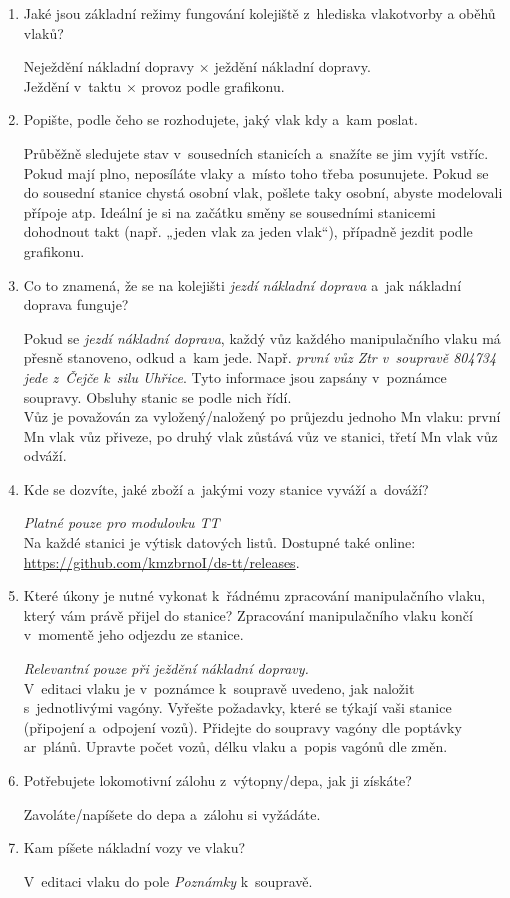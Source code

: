 \documentclass[12pt,a4paper]{article}
\def\uv#1{„#1“}
\def\solution#1{\ifsolution \par{\color{gray}#1}\fi}
\begin{document}
\begin{enumerate}[leftmargin=*]
\item Jaké jsou základní režimy fungování kolejiště z~hlediska vlakotvorby
a oběhů vlaků?
\solution{Neježdění nákladní dopravy × ježdění nákladní dopravy. \\
Ježdění v~taktu × provoz podle grafikonu.}

\item Popište, podle čeho se rozhodujete, jaký vlak kdy a~kam poslat.
\solution{Průběžně sledujete stav v~sousedních stanicích a~snažíte se jim vyjít
vstříc. Pokud mají plno, neposíláte vlaky a~místo toho třeba posunujete. Pokud
se do sousední stanice chystá osobní vlak, pošlete taky osobní, abyste
modelovali přípoje atp. Ideální je si na začátku směny se sousedními stanicemi
dohodnout takt (např. \uv{jeden vlak za jeden vlak}), případně jezdit podle
grafikonu.}

\item Co to znamená, že se na kolejišti \textit{jezdí nákladní doprava} a~jak
nákladní doprava funguje?
\solution{Pokud se \textit{jezdí nákladní doprava}, každý vůz každého
manipulačního vlaku má přesně stanoveno, odkud a~kam jede. Např. \textit{první
vůz Ztr v~soupravě 804734 jede z~Čejče k~silu Uhřice}. Tyto informace jsou
zapsány v~poznámce soupravy. Obsluhy stanic se podle nich řídí. \\ Vůz je
považován za vyložený/naložený po průjezdu jednoho Mn vlaku: první Mn vlak vůz
přiveze, po druhý vlak zůstává vůz ve stanici, třetí Mn vlak vůz odváží.}

\item Kde se dozvíte, jaké zboží a~jakými vozy stanice vyváží a~dováží?
\solution{\textit{Platné pouze pro modulovku TT} \\ Na každé stanici je výtisk
datových listů. Dostupné také online:\\
\url{https://github.com/kmzbrnoI/ds-tt/releases}}.

\item Které úkony je nutné vykonat k~řádnému zpracování manipulačního vlaku,
který vám právě přijel do stanice? Zpracování manipulačního vlaku končí
v~momentě jeho odjezdu ze stanice.
\solution{\textit{Relevantní pouze při ježdění nákladní dopravy.} \\ V~editaci
vlaku je v~poznámce k~soupravě uvedeno, jak naložit s~jednotlivými vagóny.
Vyřešte požadavky, které se týkají vaši stanice (připojení a~odpojení vozů).
Přidejte do soupravy vagóny dle poptávky ar~plánů. Upravte počet vozů, délku
vlaku a~popis vagónů dle změn.}

\item Potřebujete lokomotivní zálohu z~výtopny/depa, jak ji získáte?
\solution{Zavoláte/napíšete do depa a~zálohu si vyžádáte.}

\item Kam píšete nákladní vozy ve vlaku?
\solution{V~editaci vlaku do pole \textit{Poznámky} k~soupravě.}

\end{enumerate}
\end{document}

